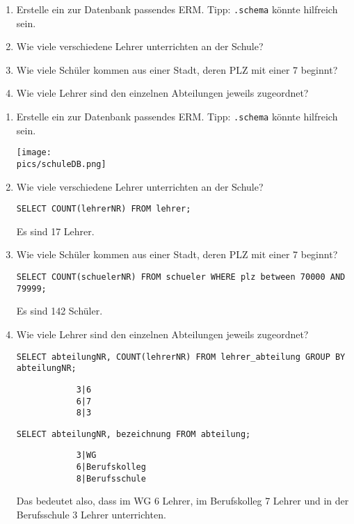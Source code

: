\begin{Exercise}[title={Bearbeite folgende Aufgaben}, label=Funktionen]
	\begin{enumerate}
		\item Erstelle ein zur Datenbank passendes ERM. Tipp: \lstinline!.schema! könnte hilfreich sein.
		\item Wie viele verschiedene Lehrer unterrichten an der Schule?
		\item Wie viele Schüler kommen aus einer Stadt, deren PLZ mit einer 7 beginnt?
		\item Wie viele Lehrer sind den einzelnen Abteilungen jeweils zugeordnet?
	\end{enumerate}
\end{Exercise}
\begin{Answer}[ref=Funktionen]
	\begin{enumerate}
		\item Erstelle ein zur Datenbank passendes ERM. Tipp: \lstinline!.schema! könnte hilfreich sein.

		\texttt{[image: \\pics/schuleDB.png]}
		\item Wie viele verschiedene Lehrer unterrichten an der Schule?

		\lstinline!SELECT COUNT(lehrerNR) FROM lehrer;!

		Es sind 17 Lehrer.
		\item Wie viele Schüler kommen aus einer Stadt, deren PLZ mit einer 7 beginnt?

		\lstinline!SELECT COUNT(schuelerNR) FROM schueler WHERE plz between 70000 AND 79999;!

		Es sind 142 Schüler.
		\item Wie viele Lehrer sind den einzelnen Abteilungen jeweils zugeordnet?

		\lstinline[breaklines=true]!SELECT abteilungNR, COUNT(lehrerNR) FROM lehrer_abteilung GROUP BY abteilungNR;!

		\begin{lstlisting}
			3|6
			6|7
			8|3\end{lstlisting}
		\lstinline!SELECT abteilungNR, bezeichnung FROM abteilung;!\\
		\begin{lstlisting}
			3|WG
			6|Berufskolleg
			8|Berufsschule\end{lstlisting}
		Das bedeutet also, dass im WG 6 Lehrer, im Berufskolleg 7 Lehrer und in der Berufsschule 3 Lehrer unterrichten.
	\end{enumerate}
\end{Answer}